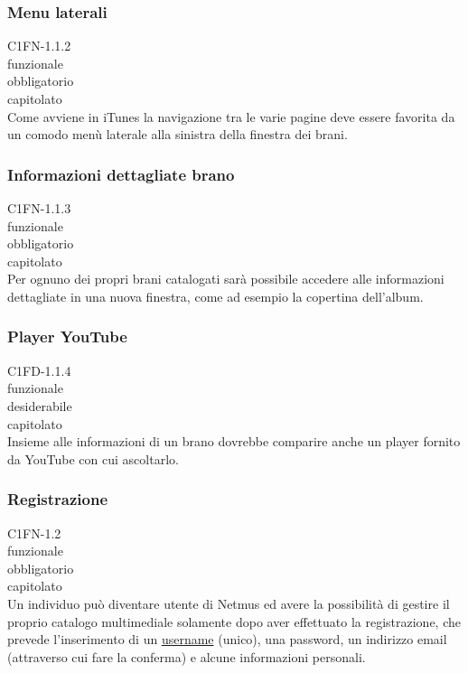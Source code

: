 \subsubsection*{Menu laterali}
 C1FN-1.1.2 \\
 funzionale \\
 obbligatorio \\
 capitolato \\
Come avviene in iTunes la navigazione tra le varie pagine deve essere favorita
da un comodo men\`u laterale alla sinistra della finestra dei brani.

\subsubsection*{Informazioni dettagliate brano}
 C1FN-1.1.3 \\
 funzionale \\
 obbligatorio \\
 capitolato \\
Per ognuno dei propri brani catalogati sar\`a possibile accedere alle informazioni
dettagliate in una nuova finestra, come ad esempio la copertina dell'album.

\subsubsection*{Player YouTube}
 C1FD-1.1.4 \\
 funzionale \\
 desiderabile \\
 capitolato \\
Insieme alle informazioni di un brano dovrebbe comparire anche un player fornito
da YouTube con cui ascoltarlo.

\subsubsection*{Registrazione}
 C1FN-1.2 \\
 funzionale \\
 obbligatorio \\
 capitolato \\
Un individuo pu\`o diventare utente di Netmus ed avere la possibilit\`a di gestire
il proprio catalogo multimediale solamente dopo aver effettuato la
registrazione, che prevede l'inserimento di un \underline{username} (unico), una
password, un indirizzo email (attraverso cui fare la conferma) e alcune
informazioni personali.

